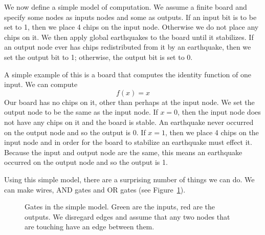 \documentclass[runningheads,a4paper]{llncs}
\begin{document}
We now define a simple model of computation. We assume a finite board and specify some nodes as inputs nodes and some as outputs. If an input bit is to be set to 1, then we place 4 chips on the input node. Otherwise we do not place any chips on it. We then apply global earthquakes to the board until it stabilizes. If an output node ever has chips redistributed from it by an earthquake, then we set the output bit to 1; otherwise, the output bit is set to 0. 

A simple example of this is a board that computes the identity function of one input. We can compute 
\begin{equation*}
f(x) = x
\end{equation*}
Our board has no chips on it, other than perhaps at the input node. We set the output node to be the same as the input node. If $x = 0$, then the input node does not have any chips on it and the board is stable. An earthquake never occurred on the output node and so the output is 0. If $x = 1$, then we place 4 chips on the input node and in order for the board to stabilize an earthquake must effect it. Because the input and output node are the same, this means an earthquake occurred on the output node and so the output is 1.


Using this simple model, there are a surprising number of things we can do. We can make wires, AND gates and OR gates (see Figure~\ref{fig:simplegates}). 

\begin{figure}
\centering
{}
\qquad\qquad
{}
\qquad\qquad
{}
\caption{Gates in the simple model. Green are the inputs, red are the outputs. We disregard edges and assume that any two nodes that are touching have an edge between them.}
\label{fig:simplegates}
\end{figure}
\end{document}
